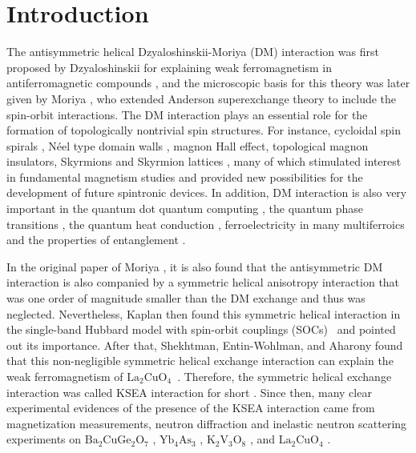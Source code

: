 \documentclass[aps,prb,twocolumn,showpacs,amssymb]{revtex4-1}
\begin{document}
\maketitle
%
%

\section{Introduction}\label{sec:intoduc}

The antisymmetric helical Dzyaloshinskii-Moriya (DM) interaction was first proposed by Dzyaloshinskii for explaining weak ferromagnetism in antiferromagnetic compounds \cite{ID1958}, and the microscopic basis for this theory was later given by Moriya \cite{T1960}, who extended Anderson superexchange theory \cite{PWA1959} to include the spin-orbit interactions.
The DM interaction plays an essential role for the formation of topologically nontrivial spin structures. For instance, cycloidal spin spirals \cite{MB2007,PF2008,SHP2014}, N\'{e}el type domain walls \cite{AK2003,MHG2008,SM2009,GC2013,SE2013,KR2013}, magnon Hall effect, topological magnon insulators, Skyrmions \cite{AN1989,AN2001,SMB2009,XZ2010,SS2012,AF2013,NN2013,RW2016} and Skyrmion lattices \cite{SH2011,NR2013,NR2015,GC2015,WJ2015,OBJ2016,CML2016,SWL2016}, many of which stimulated interest in fundamental magnetism studies and provided new possibilities for the development of future spintronic devices.
In addition, DM interaction is also very important in the quantum dot quantum computing \cite{NE2001,SC2006}, the quantum phase transitions \cite{RJ2008,ZM2013}, the quantum heat conduction \cite{LW2012}, ferroelectricity in many multiferroics \cite{ss2008,lq2008,si2006} and the properties of entanglement \cite{MK2008,MK2009,BQL2001,SHC2018}.


In the original paper of Moriya \cite{T1960}, it is also found that the antisymmetric DM interaction is also companied by a symmetric helical anisotropy interaction that was one order of magnitude smaller than the DM exchange and thus was neglected.
Nevertheless, Kaplan then found this symmetric helical interaction in the single-band Hubbard model with spin-orbit couplings (SOCs)~\cite{TAK1983} and pointed out its importance. After that, Shekhtman, Entin-Wohlman, and Aharony found that this non-negligible symmetric helical exchange interaction can explain the weak ferromagnetism of $\mathrm{La_2CuO_4}$~\cite{LSO1992}.
Therefore, the symmetric helical exchange interaction was called KSEA interaction for short \cite{JCM2013,AZS1998,AZS1999,ITJ2000,SMS2012,SMG2017,HSK2000,MDL2001,IT2003}. Since then, many clear experimental evidences of the presence of the KSEA interaction came from magnetization measurements, neutron diffraction and inelastic neutron scattering experiments on $\mathrm{Ba_2CuGe_2O_7}$ \cite{AZS1998,AZS1999,ITJ2000,SMS2012,SMG2017}, $\mathrm{Yb_4As_3}$ \cite{HSK2000}, $\mathrm{K_2V_3O_8}$ \cite{MDL2001}, and $\mathrm{La_2CuO_4}$ \cite{IT2003}.
\end{document}
